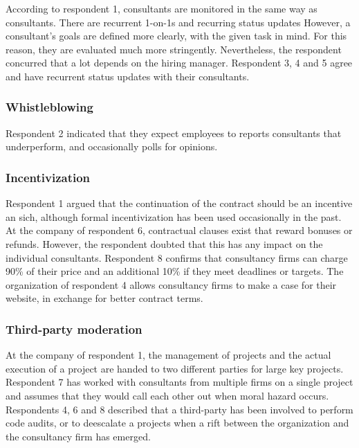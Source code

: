 \documentclass[
  man,floatsintext]{apa6}
\begin{document}
According to respondent 1, consultants are monitored in the same way as consultants. There are recurrent 1-on-1s and recurring status updates However, a consultant's goals are defined more clearly, with the given task in mind. For this reason, they are evaluated much more stringently. Nevertheless, the respondent concurred that a lot depends on the hiring manager. Respondent 3, 4 and 5 agree and have recurrent status updates with their consultants.

\subsubsection{Whistleblowing}\label{whistleblowing-1}

Respondent 2 indicated that they expect employees to reports consultants that underperform, and occasionally polls for opinions.

\subsubsection{Incentivization}\label{incentivization-1}

Respondent 1 argued that the continuation of the contract should be an incentive an sich, although formal incentivization has been used occasionally in the past. At the company of respondent 6, contractual clauses exist that reward bonuses or refunds. However, the respondent doubted that this has any impact on the individual consultants. Respondent 8 confirms that consultancy firms can charge 90\% of their price and an additional 10\% if they meet deadlines or targets. The organization of respondent 4 allows consultancy firms to make a case for their website, in exchange for better contract terms.

\subsubsection{Third-party moderation}\label{third-party-moderation-1}

At the company of respondent 1, the management of projects and the actual execution of a project are handed to two different parties for large key projects. Respondent 7 has worked with consultants from multiple firms on a single project and assumes that they would call each other out when moral hazard occurs. Respondents 4, 6 and 8 described that a third-party has been involved to perform code audits, or to deescalate a projects when a rift between the organization and the consultancy firm has emerged.
\end{document}
